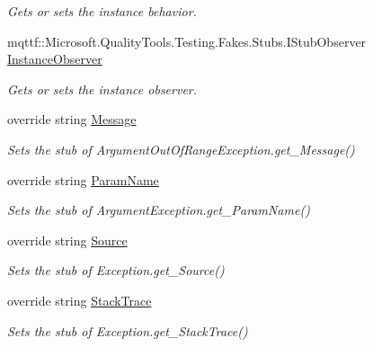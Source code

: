 \begin{DoxyCompactItemize}
\begin{DoxyCompactList}\small\item\em Gets or sets the instance behavior.\end{DoxyCompactList}\item 
mqttf\-::\-Microsoft.\-Quality\-Tools.\-Testing.\-Fakes.\-Stubs.\-I\-Stub\-Observer \hyperlink{class_system_1_1_fakes_1_1_stub_argument_out_of_range_exception_affef8a9f3e57ef56b1989518f21efacc}{Instance\-Observer}
\begin{DoxyCompactList}\small\item\em Gets or sets the instance observer.\end{DoxyCompactList}\item 
override string \hyperlink{class_system_1_1_fakes_1_1_stub_argument_out_of_range_exception_a7901710a086693bf857e456c86c2b481}{Message}
\begin{DoxyCompactList}\small\item\em Sets the stub of Argument\-Out\-Of\-Range\-Exception.\-get\-\_\-\-Message()\end{DoxyCompactList}\item 
override string \hyperlink{class_system_1_1_fakes_1_1_stub_argument_out_of_range_exception_a5ed090cb7e3a400334d5fc7d87debd07}{Param\-Name}
\begin{DoxyCompactList}\small\item\em Sets the stub of Argument\-Exception.\-get\-\_\-\-Param\-Name()\end{DoxyCompactList}\item 
override string \hyperlink{class_system_1_1_fakes_1_1_stub_argument_out_of_range_exception_af0a4d3e59f5225c7ffe81b5193692d13}{Source}
\begin{DoxyCompactList}\small\item\em Sets the stub of Exception.\-get\-\_\-\-Source()\end{DoxyCompactList}\item 
override string \hyperlink{class_system_1_1_fakes_1_1_stub_argument_out_of_range_exception_a3516636ac6320b0cfe32f1d937fb5c0a}{Stack\-Trace}
\begin{DoxyCompactList}\small\item\em Sets the stub of Exception.\-get\-\_\-\-Stack\-Trace()\end{DoxyCompactList}\end{DoxyCompactItemize}


